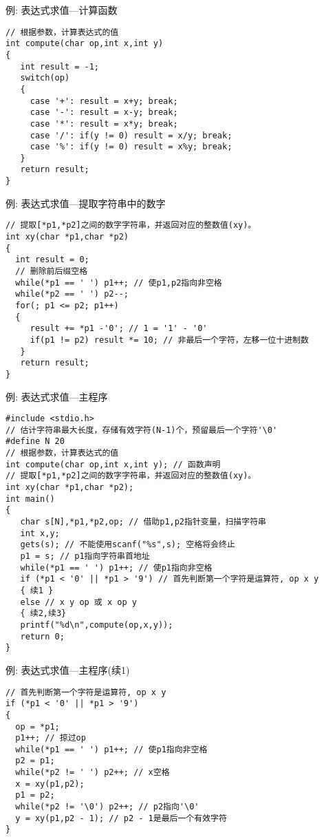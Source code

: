 \begin{frame}{例: 表达式求值---计算函数}
\begin{lstlisting}
// 根据参数，计算表达式的值 
int compute(char op,int x,int y)
{
   int result = -1;
   switch(op)
   {
     case '+': result = x+y; break;
     case '-': result = x-y; break;
     case '*': result = x*y; break;
     case '/': if(y != 0) result = x/y; break;
     case '%': if(y != 0) result = x%y; break;
   }
   return result;
}
\end{lstlisting}
\end{frame}

\begin{frame}{例: 表达式求值---提取字符串中的数字}
\begin{lstlisting}
// 提取[*p1,*p2]之间的数字字符串，并返回对应的整数值(xy)。  
int xy(char *p1,char *p2)
{
  int result = 0;
  // 删除前后缀空格 
  while(*p1 == ' ') p1++; // 使p1,p2指向非空格
  while(*p2 == ' ') p2--; 
  for(; p1 <= p2; p1++)
  {
     result += *p1 -'0'; // 1 = '1' - '0'
     if(p1 != p2) result *= 10; // 非最后一个字符，左移一位十进制数 
   }
   return result;
}
\end{lstlisting}
\end{frame}

\begin{frame}{例: 表达式求值---主程序}
\begin{lstlisting}
#include <stdio.h>
// 估计字符串最大长度，存储有效字符(N-1)个，预留最后一个字符'\0' 
#define N 20 
// 根据参数，计算表达式的值 
int compute(char op,int x,int y); // 函数声明
// 提取[*p1,*p2]之间的数字字符串，并返回对应的整数值(xy)。  
int xy(char *p1,char *p2);
int main()
{
   char s[N],*p1,*p2,op; // 借助p1,p2指针变量，扫描字符串 
   int x,y;
   gets(s); // 不能使用scanf("%s",s); 空格将会终止
   p1 = s; // p1指向字符串首地址 
   while(*p1 == ' ') p1++; // 使p1指向非空格
   if (*p1 < '0' || *p1 > '9') // 首先判断第一个字符是运算符, op x y
   { 续1 }
   else // x y op 或 x op y 
   { 续2,续3}
   printf("%d\n",compute(op,x,y)); 
   return 0;
}
\end{lstlisting}
\end{frame}

\begin{frame}{例: 表达式求值---主程序(续1)}
\begin{lstlisting}
// 首先判断第一个字符是运算符, op x y
if (*p1 < '0' || *p1 > '9')
{
  op = *p1;
  p1++; // 掠过op 
  while(*p1 == ' ') p1++; // 使p1指向非空格
  p2 = p1; 
  while(*p2 != ' ') p2++; // x空格
  x = xy(p1,p2);
  p1 = p2;
  while(*p2 != '\0') p2++; // p2指向'\0' 
  y = xy(p1,p2 - 1); // p2 - 1是最后一个有效字符 
} 
\end{lstlisting}
\end{frame}

